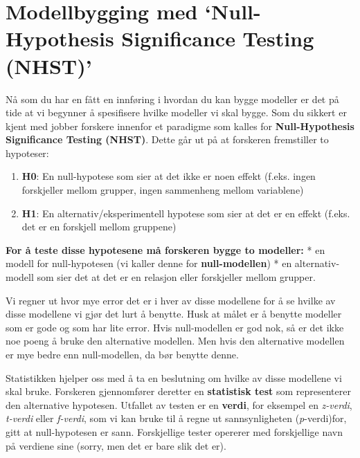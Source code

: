 \documentclass[
]{book}
\providecommand{\tightlist}{%
  \setlength{\itemsep}{0pt}\setlength{\parskip}{0pt}}
\begin{document}
\hypertarget{modellbygging-med-null-hypothesis-significance-testing-nhst}{%
\section{Modellbygging med `Null-Hypothesis Significance Testing (NHST)'}\label{modellbygging-med-null-hypothesis-significance-testing-nhst}}

Nå som du har en fått en innføring i hvordan du kan bygge modeller er det på tide at vi begynner å spesifisere hvilke modeller vi skal bygge. Som du sikkert er kjent med jobber forskere innenfor et paradigme som kalles for \textbf{Null-Hypothesis Significance Testing (NHST)}. Dette går ut på at forskeren fremstiller to hypoteser:

\begin{enumerate}
\def\labelenumi{\arabic{enumi}.}
\tightlist
\item
  \textbf{H0}: En null-hypotese som sier at det ikke er noen effekt (f.eks. ingen forskjeller mellom grupper, ingen sammenheng mellom variablene)
\item
  \textbf{H1}: En alternativ/eksperimentell hypotese som sier at det er en effekt (f.eks. det er en forskjell mellom gruppene)
\end{enumerate}

\textbf{For å teste disse hypotesene må forskeren bygge to modeller:}
* en modell for null-hypotesen (vi kaller denne for \textbf{null-modellen})
* en alternativ-modell som sier det at det er en relasjon eller forskjeller mellom grupper.

Vi regner ut hvor mye error det er i hver av disse modellene for å se hvilke av disse modellene vi gjør det lurt å benytte. Husk at målet er å benytte modeller som er gode og som har lite error. Hvis null-modellen er god nok, så er det ikke noe poeng å bruke den alternative modellen. Men hvis den alternative modellen er mye bedre enn null-modellen, da bør benytte denne.

Statistikken hjelper oss med å ta en beslutning om hvilke av disse modellene vi skal bruke. Forskeren gjennomfører deretter en \textbf{statistisk test} som representerer den alternative hypotesen. Utfallet av testen er en \textbf{verdi}, for eksempel en \emph{z-verdi}, \emph{t-verdi} eller \emph{f-verdi}, som vi kan bruke til å regne ut sannsynligheten (\emph{p}-verdi)for, gitt at null-hypotesen er sann. Forskjellige tester opererer med forskjellige navn på verdiene sine (sorry, men det er bare slik det er).
\end{document}
